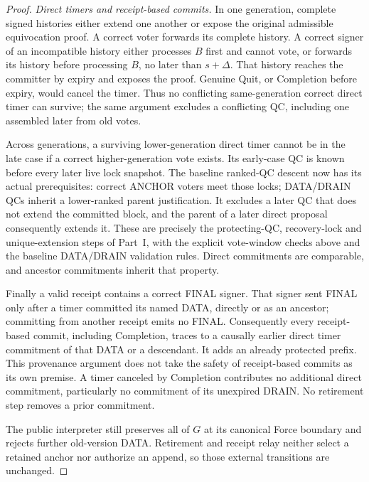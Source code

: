 \begin{proof}
\emph{Direct timers and receipt-based commits.}
In one generation, complete signed histories either extend one
another or expose the original admissible equivocation proof.
A correct voter forwards its complete history. A correct signer of
an incompatible history either processes $B$ first and cannot vote,
or forwards its history before processing $B$, no later than
$s+\Delta$. That history reaches the committer by expiry and exposes
the proof. Genuine Quit, or Completion before expiry, would cancel
the timer. Thus no conflicting same-generation correct direct timer
can survive; the same argument excludes a conflicting QC, including
one assembled later from old votes.

Across generations, a surviving lower-generation direct timer cannot
be in the late case if a correct higher-generation vote exists.
Its early-case QC is known before every later live lock snapshot.
The baseline ranked-QC descent now has its actual prerequisites:
correct ANCHOR voters meet those locks; DATA/DRAIN QCs inherit a
lower-ranked parent justification. It excludes a later QC that does
not extend the committed block, and the parent of a later direct
proposal consequently extends it. These are precisely the
protecting-QC, recovery-lock and unique-extension steps of Part~I,
with the explicit vote-window checks above and the baseline
DATA/DRAIN validation rules. Direct commitments are comparable, and
ancestor commitments inherit that property.

Finally a valid receipt contains a correct FINAL signer. That signer
sent FINAL only after a timer committed its named DATA, directly or
as an ancestor; committing from another receipt emits no FINAL.
Consequently every receipt-based commit, including Completion, traces
to a causally earlier direct timer commitment of that DATA or a
descendant. It adds an already protected prefix. This provenance
argument does not take the safety of receipt-based commits as its own
premise. A timer canceled by Completion contributes no additional
direct commitment, particularly no commitment of its unexpired DRAIN.
No retirement step removes a prior commitment.

The public interpreter still preserves all of $G$ at its canonical
Force boundary and rejects further old-version DATA. Retirement and
receipt relay neither select a retained anchor nor authorize an
append, so those external transitions are unchanged.
\end{proof}

